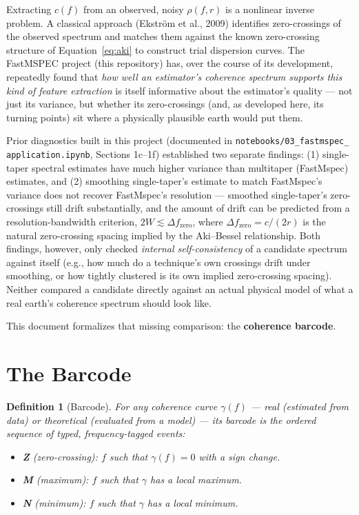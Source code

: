 \documentclass[11pt]{article}
\newtheorem{definition}{Definition}
\begin{document}
Extracting $c(f)$ from an observed, noisy $\rho(f,r)$ is a nonlinear inverse problem. A classical
approach (Ekstr\"om et al., 2009) identifies zero-crossings of the observed spectrum and matches
them against the known zero-crossing structure of Equation~\ref{eq:aki} to construct trial
dispersion curves. The FastMSPEC project (this repository) has, over the course of its
development, repeatedly found that \emph{how well an estimator's coherence spectrum supports
this kind of feature extraction} is itself informative about the estimator's quality --- not just
its variance, but whether its zero-crossings (and, as developed here, its turning points) sit
where a physically plausible earth would put them.

Prior diagnostics built in this project (documented in \texttt{notebooks/03\_fastmspec\_
application.ipynb}, Sections 1c--1f) established two separate findings: (1) single-taper
spectral estimates have much higher variance than multitaper (FastMspec) estimates, and (2)
smoothing single-taper's estimate to match FastMspec's variance does not recover FastMspec's
resolution --- smoothed single-taper's zero-crossings still drift substantially, and the amount
of drift can be predicted from a resolution-bandwidth criterion, $2W \lesssim \Delta f_{\text{zero}}$,
where $\Delta f_{\text{zero}} = c/(2r)$ is the natural zero-crossing spacing implied by the
Aki--Bessel relationship. Both findings, however, only checked \emph{internal self-consistency}
of a candidate spectrum against itself (e.g., how much do a technique's own crossings drift under
smoothing, or how tightly clustered is its own implied zero-crossing spacing). Neither compared a
candidate directly against an actual physical model of what a real earth's coherence spectrum
should look like.

This document formalizes that missing comparison: the \textbf{coherence barcode}.

\section{The Barcode}

\begin{definition}[Barcode]
For any coherence curve $\gamma(f)$ --- real (estimated from data) or theoretical (evaluated from
a model) --- its \emph{barcode} is the ordered sequence of typed, frequency-tagged events:
\begin{itemize}[nosep]
  \item \textbf{Z} (zero-crossing): $f$ such that $\gamma(f) = 0$ with a sign change.
  \item \textbf{M} (maximum): $f$ such that $\gamma$ has a local maximum.
  \item \textbf{N} (minimum): $f$ such that $\gamma$ has a local minimum.
\end{itemize}
\end{definition}
\end{document}
